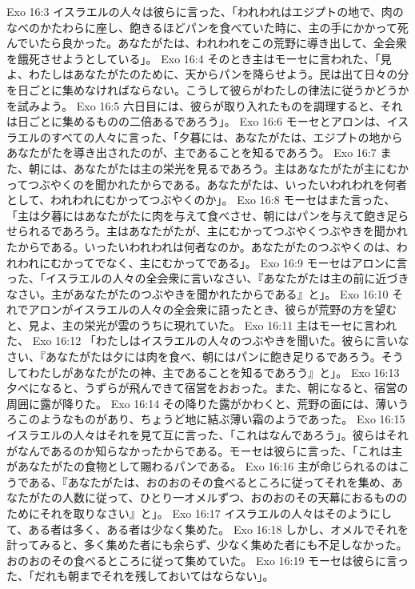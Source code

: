 Exo 16:3  イスラエルの人々は彼らに言った、「われわれはエジプトの地で、肉のなべのかたわらに座し、飽きるほどパンを食べていた時に、主の手にかかって死んでいたら良かった。あなたがたは、われわれをこの荒野に導き出して、全会衆を餓死させようとしている」。
Exo 16:4  そのとき主はモーセに言われた、「見よ、わたしはあなたがたのために、天からパンを降らせよう。民は出て日々の分を日ごとに集めなければならない。こうして彼らがわたしの律法に従うかどうかを試みよう。
Exo 16:5  六日目には、彼らが取り入れたものを調理すると、それは日ごとに集めるものの二倍あるであろう」。
Exo 16:6  モーセとアロンは、イスラエルのすべての人々に言った、「夕暮には、あなたがたは、エジプトの地からあなたがたを導き出されたのが、主であることを知るであろう。
Exo 16:7  また、朝には、あなたがたは主の栄光を見るであろう。主はあなたがたが主にむかってつぶやくのを聞かれたからである。あなたがたは、いったいわれわれを何者として、われわれにむかってつぶやくのか」。
Exo 16:8  モーセはまた言った、「主は夕暮にはあなたがたに肉を与えて食べさせ、朝にはパンを与えて飽き足らせられるであろう。主はあなたがたが、主にむかってつぶやくつぶやきを聞かれたからである。いったいわれわれは何者なのか。あなたがたのつぶやくのは、われわれにむかってでなく、主にむかってである」。
Exo 16:9  モーセはアロンに言った、「イスラエルの人々の全会衆に言いなさい、『あなたがたは主の前に近づきなさい。主があなたがたのつぶやきを聞かれたからである』と」。
Exo 16:10  それでアロンがイスラエルの人々の全会衆に語ったとき、彼らが荒野の方を望むと、見よ、主の栄光が雲のうちに現れていた。
Exo 16:11  主はモーセに言われた、
Exo 16:12  「わたしはイスラエルの人々のつぶやきを聞いた。彼らに言いなさい、『あなたがたは夕には肉を食べ、朝にはパンに飽き足りるであろう。そうしてわたしがあなたがたの神、主であることを知るであろう』と」。
Exo 16:13  夕べになると、うずらが飛んできて宿営をおおった。また、朝になると、宿営の周囲に露が降りた。
Exo 16:14  その降りた露がかわくと、荒野の面には、薄いうろこのようなものがあり、ちょうど地に結ぶ薄い霜のようであった。
Exo 16:15  イスラエルの人々はそれを見て互に言った、「これはなんであろう」。彼らはそれがなんであるのか知らなかったからである。モーセは彼らに言った、「これは主があなたがたの食物として賜わるパンである。
Exo 16:16  主が命じられるのはこうである、『あなたがたは、おのおのその食べるところに従ってそれを集め、あなたがたの人数に従って、ひとり一オメルずつ、おのおのその天幕におるもののためにそれを取りなさい』と」。
Exo 16:17  イスラエルの人々はそのようにして、ある者は多く、ある者は少なく集めた。
Exo 16:18  しかし、オメルでそれを計ってみると、多く集めた者にも余らず、少なく集めた者にも不足しなかった。おのおのその食べるところに従って集めていた。
Exo 16:19  モーセは彼らに言った、「だれも朝までそれを残しておいてはならない」。
